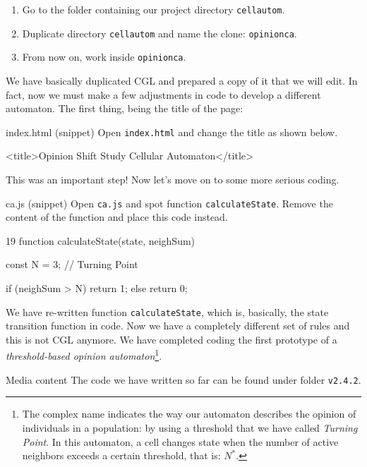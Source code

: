 \begin{enumerate}
\item Go to the folder containing our project directory \texttt{cellautom}.
\item Duplicate directory \texttt{cellautom} and name the clone: \texttt{opinionca}.
\item From now on, work inside \texttt{opinionca}.
\end{enumerate}

We have basically duplicated CGL and prepared a copy of it that we will edit. In fact, now we must
make a few adjustments in code to develop a different automaton. The first thing, being the title
of the page:

\begin{programcode}{index.html (snippet)}
Open \texttt{index.html} and change the title as shown below.
\begin{codehtml}
<title>Opinion Shift Study Cellular Automaton</title>
\end{codehtml}
\end{programcode}

This was an important step! Now let's move on to some more serious coding.

\begin{programcode}{ca.js (snippet)}
Open \texttt{ca.js} and spot function \texttt{calculateState}. Remove the content of the
function and place this code instead.
\begin{codeh1}{1}{9}
function calculateState(state, neighSum) {
  const N = 3; // Turning Point

  if (neighSum > N) {
    return 1;
  } else {
    return 0;
  }
}
\end{codeh1}
\end{programcode}

We have re-written function \texttt{calculateState}, which is, basically, the state
transition function in code. Now we have a completely different set of rules and this is
not CGL anymore. We have completed coding the first prototype of a
\textit{threshold-based opinion automaton}\footnote{The complex name indicates the way
our automaton describes the opinion of individuals in a population: by using a threshold that we
have called \textit{Turning Point}. In this automaton, a cell changes state when the number
of active neighbors exceeds a certain threshold, that is: $N^\ast$.}.

\begin{trailer}{Media content}
The code we have written so far can be found under folder \texttt{v2.4.2}.
\end{trailer}

